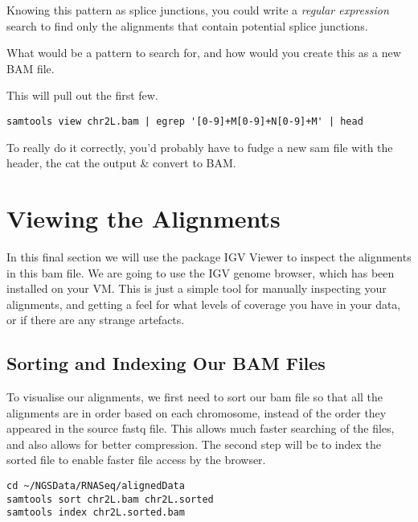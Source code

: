 \begin{advanced}
Knowing this pattern as splice junctions, you could write a \textit{regular expression} search to find only the alignments that contain potential splice junctions.
\begin{questions}
What would be a pattern to search for, and how would you create this as a new BAM file.
\begin{answer}
This will pull out the first few.
\begin{lstlisting}
samtools view chr2L.bam | egrep '[0-9]+M[0-9]+N[0-9]+M' | head
\end{lstlisting}
To really do it correctly, you'd probably have to fudge a new sam file with the header, the cat the output \& convert to BAM.
\end{answer}
\end{questions}
\end{advanced}

\section{Viewing the Alignments}
In this final section we will use the package IGV Viewer to inspect the alignments in this bam file.
We are going to use the IGV genome browser, which has been installed on your VM.
This is just a simple tool for manually inspecting your alignments, and getting a feel for what levels of coverage you have in your data, or if there are any strange artefacts.

\subsection{Sorting and Indexing Our BAM Files}
\begin{note}
To visualise our alignments, we first need to sort our bam file so that all the alignments are in order based on each chromosome, instead of the order they appeared in the source fastq file.
This allows much faster searching of the files, and also allows for better compression.
The second step will be to index the sorted file to enable faster file access by the browser.
\end{note}

\begin{steps}
\begin{lstlisting}
cd ~/NGSData/RNASeq/alignedData
samtools sort chr2L.bam chr2L.sorted
samtools index chr2L.sorted.bam
\end{lstlisting}
\end{steps}

